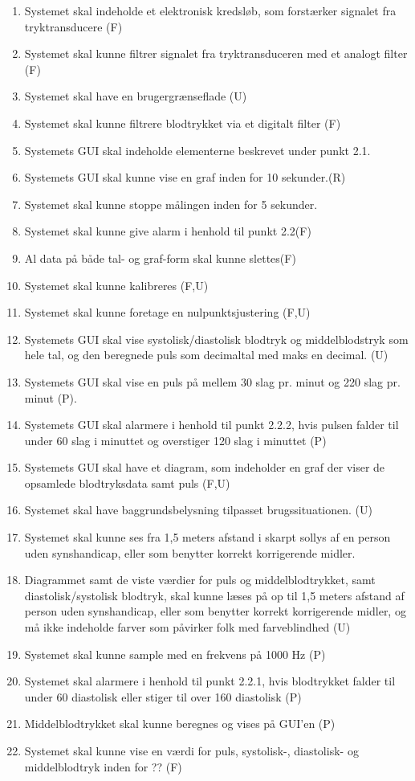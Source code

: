 \begin{enumerate}[4.1]
	\item Systemet skal indeholde et elektronisk kredsløb, som forstærker signalet fra tryktransducere (F)
	\item Systemet skal kunne filtrer signalet fra tryktransduceren med et analogt filter (F)
	\item Systemet skal have en brugergrænseflade (U)
	\item Systemet skal kunne filtrere blodtrykket via et digitalt filter (F)
	\item Systemets GUI skal indeholde elementerne beskrevet under punkt 2.1.  
	\item Systemets GUI skal kunne vise en graf inden for 10 sekunder.(R)
	\item Systemet skal kunne stoppe målingen inden for 5 sekunder.
	\item Systemet skal kunne give alarm i henhold til punkt 2.2(F)
	\item Al data på både tal- og graf-form skal kunne slettes(F)
	\item Systemet skal kunne kalibreres (F,U)
	\item Systemet skal kunne foretage en nulpunktsjustering (F,U)
	\item Systemets GUI skal vise systolisk/diastolisk blodtryk og middelblodstryk som hele tal, og den beregnede puls som decimaltal med maks en decimal. (U)
	\item Systemets GUI skal vise en puls på mellem 30 slag pr. minut og 220 slag pr. minut (P).
	\item Systemets GUI skal alarmere i henhold til punkt 2.2.2, hvis pulsen falder til under 60 slag i minuttet og overstiger 120 slag i minuttet (P)
	\item Systemets GUI skal have et diagram, som indeholder en graf der viser de opsamlede blodtryksdata samt puls (F,U)
	\item Systemet skal have baggrundsbelysning tilpasset brugssituationen. (U)
	\item Systemet skal kunne ses fra 1,5 meters afstand i skarpt sollys af en person uden synshandicap, eller som benytter korrekt korrigerende midler.
	\item Diagrammet samt de viste værdier for puls og middelblodtrykket, samt diastolisk/systolisk blodtryk, skal kunne læses på op til 1,5 meters afstand af person uden synshandicap, eller som benytter korrekt korrigerende midler, og må ikke indeholde farver som påvirker folk med farveblindhed (U)
	\item Systemet skal kunne sample med en frekvens på 1000 Hz (P)
	\item Systemet skal alarmere i henhold til punkt 2.2.1, hvis blodtrykket falder til under 60 diastolisk eller stiger til over 160 diastolisk (P)
	\item Middelblodtrykket skal kunne beregnes og vises på GUI’en (P)
	\item Systemet skal kunne vise en værdi for puls, systolisk-, diastolisk- og middelblodtryk inden for ?? (F)


\end{enumerate}
